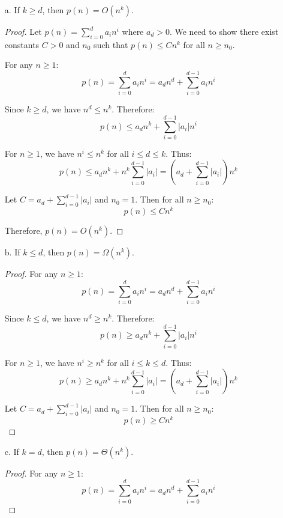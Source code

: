 \documentclass{article}
\theoremstyle{definition}
\begin{document}
\begin{enumerate}
    \item[a.] If \( k \geq d \), then \( p(n) = O(n^k) \).

    \begin{proof}
    Let \( p(n) = \sum_{i=0}^d a_i n^i \) where \( a_d > 0 \). We need to show there exist constants \( C > 0 \) and \( n_0 \) such that \( p(n) \leq Cn^k \) for all \( n \geq n_0 \).

    For any \( n \geq 1 \):
    \[ p(n) = \sum_{i=0}^d a_i n^i = a_d n^d + \sum_{i=0}^{d-1} a_i n^i \]

    Since \( k \geq d \), we have \( n^d \leq n^k \). Therefore:
    \[ p(n) \leq a_d n^k + \sum_{i=0}^{d-1} |a_i| n^i \]

    For \( n \geq 1 \), we have \( n^i \leq n^k \) for all \( i \leq d \leq k \). Thus:
    \[ p(n) \leq a_d n^k + n^k \sum_{i=0}^{d-1} |a_i| = \left(a_d + \sum_{i=0}^{d-1} |a_i|\right)n^k \]

    Let \( C = a_d + \sum_{i=0}^{d-1} |a_i| \) and \( n_0 = 1 \). Then for all \( n \geq n_0 \):
    \[ p(n) \leq Cn^k \]

    Therefore, \( p(n) = O(n^k) \).
    \end{proof}
    \item[b.] If \( k \leq d \), then \( p(n) = \Omega(n^k) \).
    \begin{proof}

    For any \( n \geq 1 \):
    \[ p(n) = \sum_{i=0}^d a_i n^i = a_d n^d + \sum_{i=0}^{d-1} a_i n^i \]

    Since \( k \leq d \), we have \( n^d \geq n^k \). Therefore:
    \[ p(n) \geq a_d n^k + \sum_{i=0}^{d-1} |a_i| n^i \]

    For \( n \geq 1 \), we have \( n^i \geq n^k \) for all \( i \leq k \leq d \). Thus:
    \[ p(n) \geq a_d n^k + n^k \sum_{i=0}^{d-1} |a_i| = \left(a_d + \sum_{i=0}^{d-1} |a_i|\right)n^k \]

    Let \( C = a_d + \sum_{i=0}^{d-1} |a_i| \) and \( n_0 = 1 \). Then for all \( n \geq n_0 \):
    \[ p(n) \geq Cn^k \]    
    \end{proof}

    \item[c.] If \( k = d \), then \( p(n) = \Theta(n^k) \).
    
    \begin{proof}

        For any \( n \geq 1 \):
        \[ p(n) = \sum_{i=0}^d a_i n^i = a_d n^d + \sum_{i=0}^{d-1} a_i n^i \]
    

\end{proof}
\end{enumerate}
\end{document}
